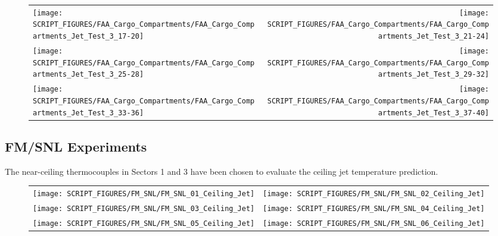 \begin{figure}[p]
\begin{tabular*}{\textwidth}{l@{\extracolsep{\fill}}r}
\texttt{[image: SCRIPT\_FIGURES/FAA\_Cargo\_Compartments/FAA\_Cargo\_Compartments\_Jet\_Test\_3\_17-20]} &
\texttt{[image: SCRIPT\_FIGURES/FAA\_Cargo\_Compartments/FAA\_Cargo\_Compartments\_Jet\_Test\_3\_21-24]} \\
\texttt{[image: SCRIPT\_FIGURES/FAA\_Cargo\_Compartments/FAA\_Cargo\_Compartments\_Jet\_Test\_3\_25-28]} &
\texttt{[image: SCRIPT\_FIGURES/FAA\_Cargo\_Compartments/FAA\_Cargo\_Compartments\_Jet\_Test\_3\_29-32]} \\
\texttt{[image: SCRIPT\_FIGURES/FAA\_Cargo\_Compartments/FAA\_Cargo\_Compartments\_Jet\_Test\_3\_33-36]} &
\texttt{[image: SCRIPT\_FIGURES/FAA\_Cargo\_Compartments/FAA\_Cargo\_Compartments\_Jet\_Test\_3\_37-40]}
\end{tabular*}
\label{FAA_Cargo_HGL_4}
\end{figure}

\clearpage




\subsection{FM/SNL Experiments}

The near-ceiling thermocouples in Sectors 1 and 3 have been chosen to evaluate the ceiling jet temperature prediction.

\begin{figure}[h!]
\begin{tabular*}{\textwidth}{l@{\extracolsep{\fill}}r}
\texttt{[image: SCRIPT\_FIGURES/FM\_SNL/FM\_SNL\_01\_Ceiling\_Jet]} &
\texttt{[image: SCRIPT\_FIGURES/FM\_SNL/FM\_SNL\_02\_Ceiling\_Jet]} \\
\texttt{[image: SCRIPT\_FIGURES/FM\_SNL/FM\_SNL\_03\_Ceiling\_Jet]} &
\texttt{[image: SCRIPT\_FIGURES/FM\_SNL/FM\_SNL\_04\_Ceiling\_Jet]} \\
\texttt{[image: SCRIPT\_FIGURES/FM\_SNL/FM\_SNL\_05\_Ceiling\_Jet]} &
\texttt{[image: SCRIPT\_FIGURES/FM\_SNL/FM\_SNL\_06\_Ceiling\_Jet]} \\
\end{tabular*}
\label{FM_SNL_Ceiling_Jet_1}
\end{figure}

\newpage

